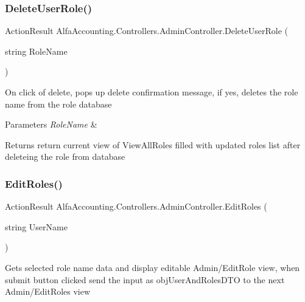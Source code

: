 \subsubsection{\texorpdfstring{Delete\+User\+Role()}{DeleteUserRole()}}
{\footnotesize\ttfamily Action\+Result Alfa\+Accounting.\+Controllers.\+Admin\+Controller.\+Delete\+User\+Role (\begin{DoxyParamCaption}\item[{string}]{Role\+Name }\end{DoxyParamCaption})}



On click of delete, pops up delete confirmation message, if yes, deletes the role name from the role database 


\begin{DoxyParams}{Parameters}
{\em Role\+Name} & \\
\hline
\end{DoxyParams}
\begin{DoxyReturn}{Returns}
return current view of View\+All\+Roles filled with updated roles list after deleteing the role from database 
\end{DoxyReturn}
\mbox{\label{class_alfa_accounting_1_1_controllers_1_1_admin_controller_a39fd305b2aeaf168ce24304fea1fa3c5}} 
\subsubsection{\texorpdfstring{Edit\+Roles()}{EditRoles()}\hspace{0.1cm}{\footnotesize\ttfamily [1/2]}}
{\footnotesize\ttfamily Action\+Result Alfa\+Accounting.\+Controllers.\+Admin\+Controller.\+Edit\+Roles (\begin{DoxyParamCaption}\item[{string}]{User\+Name }\end{DoxyParamCaption})}



Gets selected role name data and display editable Admin/\+Edit\+Role view, when submit button clicked send the input as obj\+User\+And\+Roles\+D\+TO to the next Admin/\+Edit\+Roles view 


